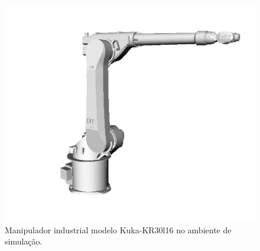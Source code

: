 \begin{figure}[h!]
\centering
	\includegraphics[width=0.8\columnwidth]{figs/openrave/kukakr30l16_openrave}
	\caption{Manipulador industrial modelo Kuka-KR30l16 no ambiente de simulação.}
	\label{fig::kukakr30l16_openrave}
\end{figure}
